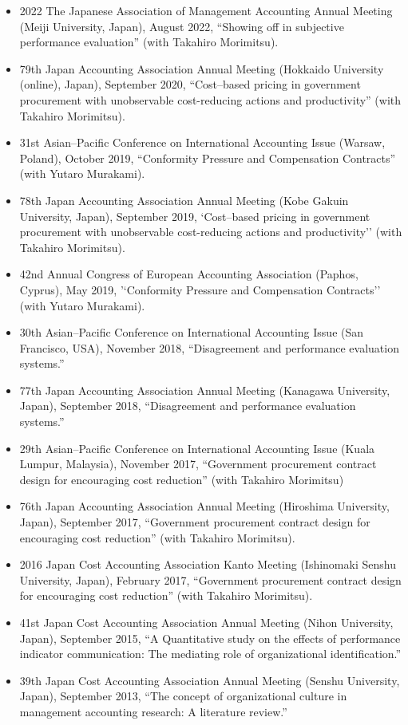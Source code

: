 \documentclass[letterpaper,11pt]{article}
\begin{document}
\begin{itemize}
    \item 2022 The Japanese Association of Management Accounting Annual Meeting (Meiji University, Japan), August 2022, ``Showing off in subjective performance evaluation''  (with Takahiro Morimitsu).
    \item 79th Japan Accounting Association Annual Meeting (Hokkaido University (online), Japan), September 2020, ``Cost--based pricing in government procurement with unobservable cost-reducing actions and productivity'' (with Takahiro Morimitsu).
    \item 31st Asian--Pacific Conference on International Accounting Issue (Warsaw, Poland), October 2019, ``Conformity Pressure and Compensation Contracts'' (with Yutaro Murakami).
    \item 78th Japan Accounting Association Annual Meeting (Kobe Gakuin University, Japan), September 2019, `Cost--based pricing in government procurement with unobservable cost-reducing actions and productivity'' (with Takahiro Morimitsu).
    \item 42nd Annual Congress of European Accounting Association (Paphos, Cyprus), May 2019, '`Conformity Pressure and Compensation Contracts'' (with Yutaro Murakami).
    \item 30th Asian--Pacific Conference on International Accounting Issue (San Francisco, USA), November 2018, ``Disagreement and performance evaluation systems.''
    \item 77th Japan Accounting Association Annual Meeting (Kanagawa University, Japan), September 2018, ``Disagreement and performance evaluation systems.''
    \item 29th Asian--Pacific Conference on International Accounting Issue (Kuala Lumpur, Malaysia), November 2017, ``Government procurement contract design for encouraging cost reduction'' (with Takahiro Morimitsu)
    \item 76th Japan Accounting Association Annual Meeting (Hiroshima University, Japan), September 2017, ``Government procurement contract design for encouraging cost reduction'' (with Takahiro Morimitsu).
    \item 2016 Japan Cost Accounting Association Kanto Meeting (Ishinomaki Senshu University, Japan), February 2017, ``Government procurement contract design for encouraging cost reduction'' (with Takahiro Morimitsu).
    \item 41st Japan Cost Accounting Association Annual Meeting (Nihon University, Japan), September 2015, ``A Quantitative study on the effects of performance indicator communication: The mediating role of organizational identification.''
    \item 39th Japan Cost Accounting Association Annual Meeting (Senshu University, Japan), September 2013, ``The concept of organizational culture in management accounting research: A literature review.''
\end{itemize}
\end{document}
